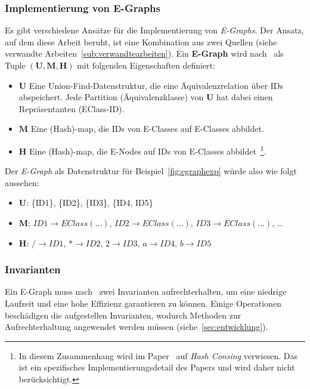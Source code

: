 \subsubsection{Implementierung von E-Graphs}

Es gibt verschiedene Ansätze für die Implementierung von \textit{E-Graphs}. Der Ansatz, auf dem diese Arbeit beruht, ist eine Kombination aus zwei Quellen 
(siehe verwandte Arbeiten~\ref{sub:verwandtearbeiten}).
Ein \textbf{E-Graph} wird nach~\cite{2021-egg} als Tuple $(\mathbf{U}, \mathbf{M}, \mathbf{H})$ mit folgenden Eigenschaften definiert:

\begin{itemize}
  \item $\mathbf{U}$ Eine Union-Find-Datenstruktur, die eine Äquivalenzrelation über IDs abspeichert. Jede Partition (Äquivalenzklasse) von $\mathbf{U}$ hat dabei einen Repräsentanten (EClass-ID).
  \item $\mathbf{M}$ Eine (Hash)-map, die IDs von E-Classes auf E-Classes abbildet. 
  \item $\mathbf{H}$ Eine (Hash)-map, die E-Nodes auf IDs von E-Classes abbildet~\footnote{In diesem Zusammenhang wird im Paper~\cite{2021-egg} auf \textit{Hash Consing} verwiesen. Das ist ein spezifisches Implementierungsdetail des Papers und wird daher nicht berücksichtigt.}.
\end{itemize}

Der \textit{E-Graph} als Datenstruktur für Beispiel~\ref{fig:egraphexp} würde also wie folgt aussehen:

\begin{itemize}
  \item $\mathbf{U}$: \{ID1\}, \{ID2\}, \{ID3\}, \{ID4, ID5\} 
  \item $\mathbf{M}$: $ID1 \rightarrow EClass(\ldots)$, $ID2 \rightarrow EClass(\ldots)$, $ID3 \rightarrow EClass(\ldots)$, \ldots 
  \item $\mathbf{H}$: $/ \rightarrow ID1$, $* \rightarrow ID2$, $2 \rightarrow ID3$, $a \rightarrow ID4$, $b \rightarrow ID5$
\end{itemize}

\subsubsection{Invarianten}

Ein E-Graph muss nach~\cite{2021-egg} zwei Invarianten aufrechterhalten, um eine niedrige Laufzeit und eine hohe Effizienz garantieren zu können. 
Einige Operationen beschädigen die aufgestellen Invarianten, wodurch Methoden zur Aufrechterhaltung angewendet werden müssen (siehe~\ref{sec:entwicklung}).

